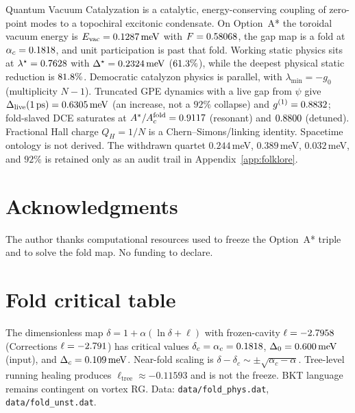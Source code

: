 \documentclass[11pt,letterpaper]{article}
\begin{document}
Quantum Vacuum Catalyzation is a catalytic, energy-conserving coupling of zero-point modes to a topochiral excitonic condensate. On Option~A* the toroidal vacuum energy is $E_{\mathrm{vac}}=0.1287\,\mathrm{meV}$ with $F=0.58068$, the gap map is a fold at $\alpha_c=0.1818$, and unit participation is past that fold. Working static physics sits at $\lambda^\star=0.7628$ with $\Delta^\star=0.2324\,\mathrm{meV}$ ($61.3\%$), while the deepest physical static reduction is $81.8\%$. Democratic catalyzon physics is parallel, with $\lambda_{\min}=-g_0$ (multiplicity $N-1$). Truncated GPE dynamics with a live gap from $\psi$ give $\Delta_{\mathrm{live}}(1\,\mathrm{ps})=0.6305\,\mathrm{meV}$ (an increase, not a $92\%$ collapse) and $g^{(1)}=0.8832$; fold-slaved DCE saturates at $A^*/A_c^{\mathrm{fold}}=0.9117$ (resonant) and $0.8800$ (detuned). Fractional Hall charge $Q_H=1/N$ is a Chern--Simons/linking identity. Spacetime ontology is not derived. The withdrawn quartet $0.244$\,meV, $0.389$\,meV, $0.032$\,meV, and $92\%$ is retained only as an audit trail in Appendix~\ref{app:folklore}.

\section*{Acknowledgments}
The author thanks computational resources used to freeze the Option~A* triple and to solve the fold map. No funding to declare.

\appendix
\section{Fold critical table}
\label{app:fold}
The dimensionless map $\delta=1+\alpha(\ln\delta+\ell)$ with frozen-cavity $\ell=-2.7958$ (Corrections $\ell=-2.791$) has critical values $\delta_c=\alpha_c=0.1818$, $\Delta_0=0.600\,\mathrm{meV}$ (input), and $\Delta_c=0.109\,\mathrm{meV}$. Near-fold scaling is $\delta-\delta_c\sim\pm\sqrt{\alpha_c-\alpha}$. Tree-level running healing produces $\ell_{\mathrm{tree}}\approx-0.11593$ and is not the freeze. BKT language remains contingent on vortex RG. Data: \texttt{data/fold\_phys.dat}, \texttt{data/fold\_unst.dat}.
\end{document}
